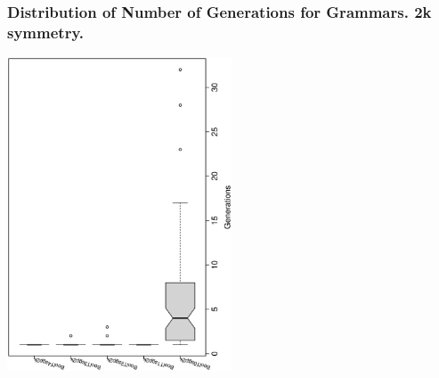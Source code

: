  \begin{frame}
 \frametitle{ Distribution of Number of Generations for Grammars. 2k  symmetry. }
 \begin{center}
\includegraphics[width=0.5\textwidth, angle=-90]
{ExpBboxplottGenerations000.eps}
 \end{center}
 \label{ExpBboxplottGenerations000.eps}  
 \end{frame}


